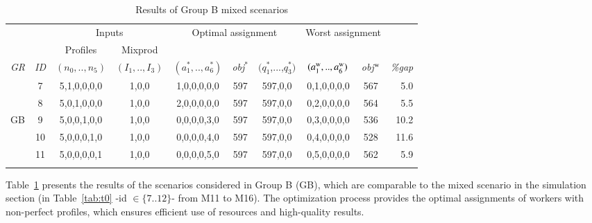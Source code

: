 \documentclass[review,12pt, 3p, times]{elsarticle}
\begin{document}
					
\begin{longtable}{|c|c|c|c|c|c|c|c|c|r|}
    \hline
    & & \multicolumn{2}{c|}{Inputs} & \multicolumn{3}{c|}{Optimal assignment} & \multicolumn{2}{c|}{Worst assignment }& \\
    & \multicolumn{1}{c|}{ } & \multicolumn{1}{c|}{Profiles} & \multicolumn{1}{c|}{Mixprod}& \multicolumn{1}{c}{}   & \multicolumn{2}{c|}{} & \multicolumn{2}{c|}{}&\multicolumn{1}{c|}{}\\
    \it{GR} & \it{ID} & \multicolumn{1}{c|}{$(n_0,..,n_5)$} & \multicolumn{1}{c|}{$(I_1,..,I_3)$} & {$(a^*_1,..,a^*_6)$} & \it{obj}$^*$ & $(q^*_1$,...,$q^*_3)$ & {$(a^{\textsc{w}}_1,..,a^{\textsc{w}}_6)$} & \it{obj}$^{\textsc{w}}$ & \it{\%gap} \\ %
    \hline
    & 7 & 5,1,0,0,0,0 & 1,0,0 & 1,0,0,0,0,0 & 597 & 597,0,0 & 0,1,0,0,0,0 & 567 & 5.0        \\
    & 8 & 5,0,1,0,0,0 & 1,0,0 & 2,0,0,0,0,0 & 597 & 597,0,0 & 0,2,0,0,0,0 & 564 & 5.5        \\
 GB & 9 & 5,0,0,1,0,0 & 1,0,0 & 0,0,0,0,3,0 & 597 & 597,0,0 & 0,3,0,0,0,0 & 536 & 10.2       \\
    & 10& 5,0,0,0,1,0 & 1,0,0 & 0,0,0,0,4,0 & 597 & 597,0,0 & 0,4,0,0,0,0 & 528 & 11.6       \\
    & 11& 5,0,0,0,0,1 & 1,0,0 & 0,0,0,0,5,0 & 597 & 597,0,0 & 0,5,0,0,0,0 & 562 & 5.9        \\
    \hline
    \caption{Results of Group B mixed scenarios} 													
    \label{tab:tr_gb}
\end{longtable}
										
Table~\ref{tab:tr_gb} presents the results of the scenarios considered in Group B (GB), which are comparable to the mixed scenario in the simulation section (in Table~\ref{tab:t0} -id $\in \{7..12\}$- from M11 to M16). The optimization process provides the optimal assignments of workers with non-perfect profiles, which ensures efficient use of resources and high-quality results.
			
\end{document}
